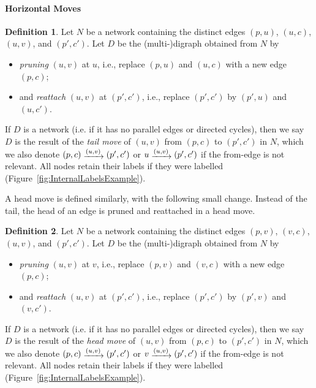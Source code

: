\documentclass{article}
\theoremstyle{definition}
\newtheorem{definition}{Definition}
\newcommand{\move}[1]{\mathrel{\raisebox{-2pt}{$\xrightarrow{#1}$}}}
\begin{document}
\paragraph{Horizontal Moves}

\begin{definition}\label{def:tail}
Let $N$ be a network containing the distinct edges $(p,u)$, $(u,c)$, $(u,v)$, and $(p',c')$. 
Let $D$ be the (multi-)digraph obtained from $N$ by 
\begin{itemize}
    \item \emph{pruning} $(u,v)$ at $u$, i.e., replace $(p,u)$ and $(u,c)$ with a new edge $(p,c)$;
    \item and \emph{reattach} $(u,v)$ at $(p',c')$, i.e., replace $(p',c')$ by $(p',u)$ and $(u,c')$.
\end{itemize}
If $D$ is a network (i.e. if it has no parallel edges or directed cycles), then we say $D$ is the result of the \emph{tail move} of $(u,v)$ from $(p,c)$ to $(p',c')$ in $N$, which we also denote $(p,c)\move{(u,v)}(p',c')$ or $u\move{(u,v)}(p',c')$ if the from-edge is not relevant. All nodes retain their labels if they were labelled (Figure~\ref{fig:InternalLabelsExample}).
\end{definition}

A head move is defined similarly, with the following small change. Instead of the tail, the head of an edge is pruned and reattached in a head move.

\begin{definition}\label{def:head}
Let $N$ be a network containing the distinct edges $(p,v)$, $(v,c)$, $(u,v)$, and $(p',c')$. 
Let $D$ be the (multi-)digraph obtained from $N$ by 
\begin{itemize}
    \item \emph{pruning} $(u,v)$ at $v$, i.e., replace $(p,v)$ and $(v,c)$ with a new edge $(p,c)$;
    \item and \emph{reattach} $(u,v)$ at $(p',c')$, i.e., replace $(p',c')$ by $(p',v)$ and $(v,c')$.
\end{itemize}
If $D$ is a network (i.e. if it has no parallel edges or directed cycles), then we say $D$ is the result of the \emph{head move} of $(u,v)$ from $(p,c)$ to $(p',c')$ in $N$, which we also denote $(p,c)\move{(u,v)}(p',c')$ or $v\move{(u,v)}(p',c')$ if the from-edge is not relevant.
All nodes retain their labels if they were labelled (Figure~\ref{fig:InternalLabelsExample}). 
\end{definition}
\end{document}
